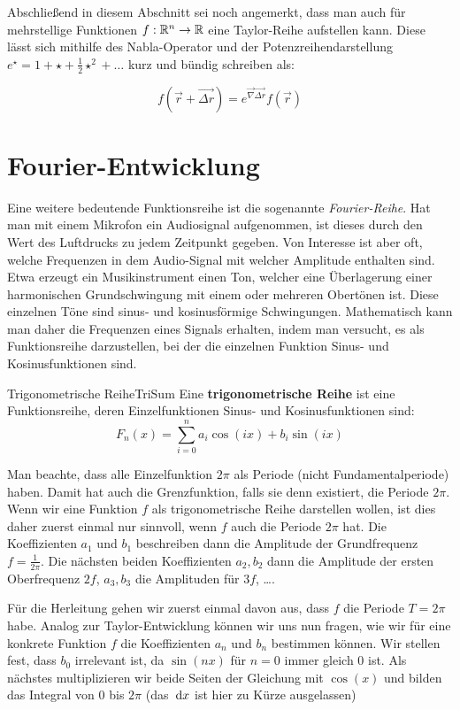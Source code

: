 Abschließend in diesem Abschnitt sei noch angemerkt, dass man auch für mehrstellige Funktionen $f:\mathbb{R}^n\to \mathbb{R}$ eine Taylor-Reihe aufstellen kann. Diese lässt sich mithilfe des Nabla-Operator und der Potenzreihendarstellung $e^{\star} = 1 + \star + \frac{1}{2} \star^2 + \dots$ kurz und bündig schreiben als:

$$
    f(\vec{r}+\vec{\Delta r}) = e^{\vec{\nabla} \vec{\Delta r}} f(\vec{r})
$$

\section{Fourier-Entwicklung}

Eine weitere bedeutende Funktionsreihe ist die sogenannte \emph{Fourier-Reihe}. Hat man mit einem Mikrofon ein Audiosignal aufgenommen, ist dieses durch den Wert des Luftdrucks zu jedem Zeitpunkt gegeben. Von Interesse ist aber oft, welche Frequenzen in dem Audio-Signal mit welcher Amplitude enthalten sind. Etwa erzeugt ein Musikinstrument einen Ton, welcher eine Überlagerung einer harmonischen Grundschwingung mit einem oder mehreren Obertönen ist. Diese einzelnen Töne sind sinus- und kosinusförmige Schwingungen. Mathematisch kann man daher die Frequenzen eines Signals erhalten, indem man versucht, es als Funktionsreihe darzustellen, bei der die einzelnen Funktion Sinus- und Kosinusfunktionen sind.

\begin{definition}{Trigonometrische Reihe}{TriSum}
    Eine \textbf{trigonometrische Reihe} ist eine Funktionsreihe, deren Einzelfunktionen Sinus- und Kosinusfunktionen sind:
    $$
        F_n(x) = \sum\limits_{i=0}^n a_i \cos(ix) + b_i \sin(ix)
    $$
\end{definition}

Man beachte, dass alle Einzelfunktion $2\pi$ als Periode (nicht Fundamentalperiode) haben. Damit hat auch die Grenzfunktion, falls sie denn existiert, die Periode $2\pi$. Wenn wir eine Funktion $f$ als trigonometrische Reihe darstellen wollen, ist dies daher zuerst einmal nur sinnvoll, wenn $f$ auch die Periode $2\pi$ hat. Die Koeffizienten $a_1$ und $b_1$ beschreiben dann die Amplitude der Grundfrequenz $f=\frac{1}{2\pi}$. Die nächsten beiden Koeffizienten $a_2, b_2$ dann die Amplitude der ersten Oberfrequenz $2f$, $a_3, b_3$ die Amplituden für $3f$, \dots.

Für die Herleitung gehen wir zuerst einmal davon aus, dass $f$ die Periode $T=2\pi$ habe. Analog zur Taylor-Entwicklung können wir uns nun fragen, wie wir für eine konkrete Funktion $f$ die Koeffizienten $a_n$ und $b_n$ bestimmen können. Wir stellen fest, dass $b_0$ irrelevant ist, da $\sin(nx)$ für $n=0$ immer gleich $0$ ist. Als nächstes multiplizieren wir beide Seiten der Gleichung mit $\cos(x)$ und bilden das Integral von $0$ bis $2\pi$ (das $\:\mathrm{d}{x}$ ist hier zu Kürze ausgelassen)


